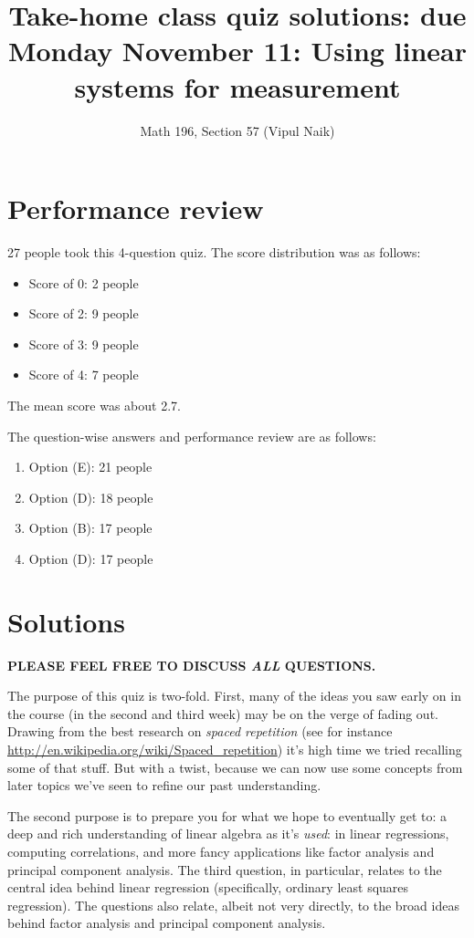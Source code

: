 \documentclass[10pt]{amsart}
\title{Take-home class quiz solutions: due Monday November 11: Using linear systems for measurement}
\author{Math 196, Section 57 (Vipul Naik)}
\begin{document}
\maketitle

\section{Performance review}

27 people took this 4-question quiz. The score distribution was as
follows:

\begin{itemize}
\item Score of 0: 2 people
\item Score of 2: 9 people
\item Score of 3: 9 people
\item Score of 4: 7 people
\end{itemize}

The mean score was about 2.7.

The question-wise answers and performance review are as follows:

\begin{enumerate}
\item Option (E): 21 people
\item Option (D): 18 people
\item Option (B): 17 people
\item Option (D): 17 people
\end{enumerate}

\section{Solutions}

{\bf PLEASE FEEL FREE TO DISCUSS {\em ALL} QUESTIONS.}

The purpose of this quiz is two-fold. First, many of the ideas you saw
early on in the course (in the second and third week) may be on the
verge of fading out. Drawing from the best research on {\em spaced
  repetition} (see for instance
\url{http://en.wikipedia.org/wiki/Spaced_repetition}) it's high time
we tried recalling some of that stuff. But with a twist, because we
can now use some concepts from later topics we've seen to refine our
past understanding.

The second purpose is to prepare you for what we hope to eventually
get to: a deep and rich understanding of linear algebra as it's {\em
  used}: in linear regressions, computing correlations, and more fancy
applications like factor analysis and principal component
analysis. The third question, in particular, relates to the central
idea behind linear regression (specifically, ordinary least squares
regression). The questions also relate, albeit not very directly, to the
broad ideas behind factor analysis and principal component analysis.
\end{document}
